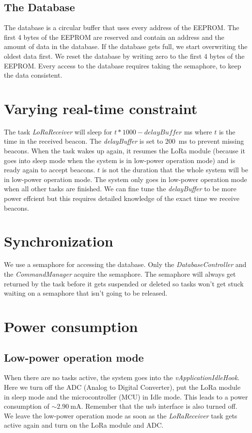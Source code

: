 \documentclass{scrartcl}
\begin{document}
\subsection{The Database}
The database is a circular buffer that uses every address of the EEPROM.
The first 4 bytes of the EEPROM are reserved and contain an address and the amount of data in the database.
If the database gets full, we start overwriting the oldest data first.
We reset the database by writing zero to the first 4 bytes of the EEPROM.
Every access to the database requires taking the semaphore, to keep the data consistent.

\section{Varying real-time constraint}
The task \textit{LoRaReceiver} will sleep for $t*1000 - \textit{delayBuffer}$ \si{\milli\second} where $t$ is the time in the received beacon.
The \textit{delayBuffer} is set to \SI{200}{\milli\second} to prevent missing beacons.
When the task wakes up again, it resumes the LoRa module (because it goes into sleep mode when the system is in low-power operation mode)
and is ready again to accept beacons. $t$ is not the duration that the whole system will be in low-power operation mode.
The system only goes in low-power operation mode when all other tasks are finished.
We can fine tune the \textit{delayBuffer} to be more power effcient but this requires detailed knowledge of the exact time
we receive beacons.

\newpage

\section{Synchronization}
We use a semaphore for accessing the database. Only the \textit{DatabaseController} and the \textit{CommandManager} acquire the semaphore.
The semaphore will always get returned by the task before it gets suspended or deleted so tasks won't get stuck waiting on a semaphore
that isn't going to be released.

\section{Power consumption}
\subsection{Low-power operation mode}
When there are no tasks active, the system goes into the \textit{vApplicationIdleHook}.
Here we turn off the ADC (Analog to Digital Converter),
put the LoRa module in sleep mode and the microcontroller (MCU) in Idle mode.
This leads to a power consumption of $\sim \SI{2.90}{\milli\ampere}$.
Remember that the usb interface is also turned off.
We leave the low-power operation mode as soon as the \textit{LoRaReceiver} task gets active again and
turn on the LoRa module and ADC.
\end{document}
